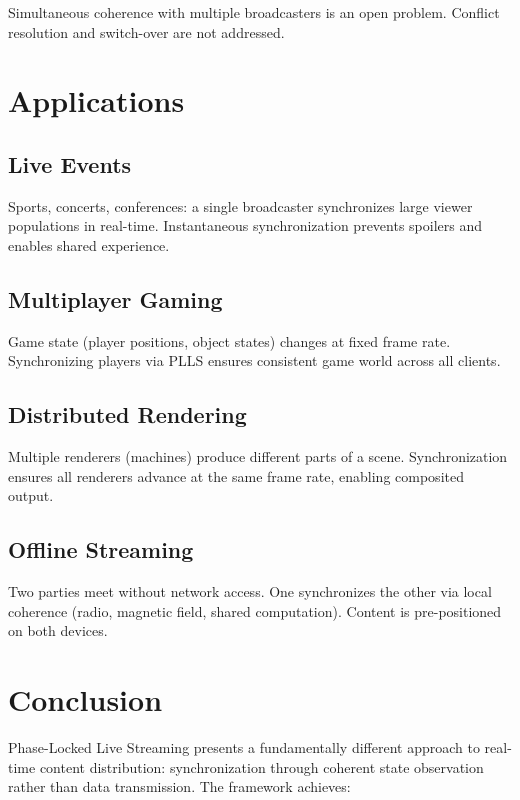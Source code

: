 \documentclass[twocolumn,10pt,a4paper]{article}
\theoremstyle{plain}
\theoremstyle{definition}
\begin{document}
Simultaneous coherence with multiple broadcasters is an open problem. Conflict resolution and switch-over are not addressed.

\section{Applications}
\label{sec:applications}

\subsection{Live Events}

Sports, concerts, conferences: a single broadcaster synchronizes large viewer populations in real-time. Instantaneous synchronization prevents spoilers and enables shared experience.

\subsection{Multiplayer Gaming}

Game state (player positions, object states) changes at fixed frame rate. Synchronizing players via PLLS ensures consistent game world across all clients.

\subsection{Distributed Rendering}

Multiple renderers (machines) produce different parts of a scene. Synchronization ensures all renderers advance at the same frame rate, enabling composited output.

\subsection{Offline Streaming}

Two parties meet without network access. One synchronizes the other via local coherence (radio, magnetic field, shared computation). Content is pre-positioned on both devices.

\section{Conclusion}

Phase-Locked Live Streaming presents a fundamentally different approach to real-time content distribution: synchronization through coherent state observation rather than data transmission. The framework achieves:
\end{document}
